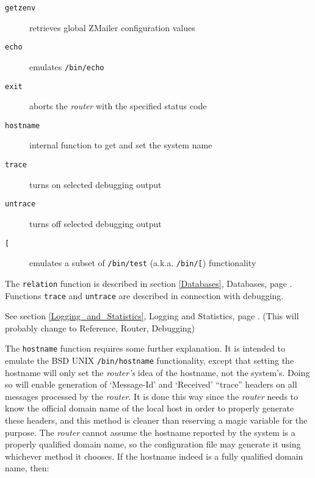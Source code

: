 \begin{description}
\item[{\tt getzenv}] \mbox{}

retrieves global ZMailer configuration values

\item[{\tt echo}] \mbox{}

emulates {\tt /bin/echo}

\item[{\tt exit}] \mbox{}

aborts the {\em router\/} with the specified status code

\item[{\tt hostname}] \mbox{}

internal function to get and set the system name

\item[{\tt trace}] \mbox{}

turns on selected debugging output

\item[{\tt untrace}] \mbox{}

turns off selected debugging output

\item[{\tt [}] \mbox{}

emulates a subset of {\tt /bin/test}
(a.k.a. {\tt /bin/[}) functionality    

\end{description}


The {\tt relation} function is described in section
\ref{Databases},  Databases,
page \pageref{Databases}.
Functions {\tt trace} and {\tt untrace} are described
in connection with debugging. 

See section \ref{Logging_and_Statistics}, Logging and Statistics,
page \pageref{Logging_and_Statistics}.
(This will probably change to Reference, Router, Debugging)

The {\tt hostname} function requires some further explanation.
It is intended to emulate the BSD UNIX {\tt /bin/hostname}
functionality, except that setting the hostname will only set
the {\em router's\/} idea of the hostname, not the system's.
Doing so will enable generation of `Message-Id' and `Received'
``trace'' headers on all messages processed by the {\em router\/}.
It is done this way since the {\em router\/} needs to know the official
domain name of the local host in order to properly generate these headers,
and this method is cleaner than reserving a magic variable for the purpose.
The {\em router\/} cannot assume the hostname reported by the system is
a properly qualified domain name, so the configuration file may generate
it using whichever method it chooses.
If the hostname indeed is a fully qualified domain name, then:

